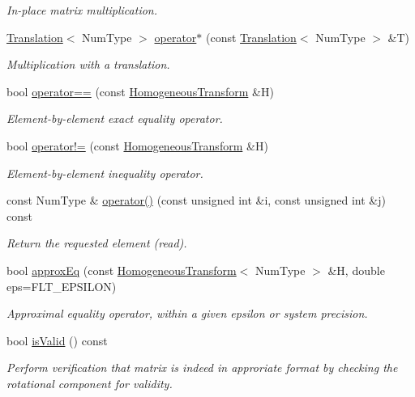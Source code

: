 \begin{DoxyCompactItemize}
\begin{DoxyCompactList}\small\item\em In-\/place matrix multiplication. \end{DoxyCompactList}\item 
\hyperlink{singletonscrews_1_1_translation}{Translation}$<$ Num\+Type $>$ \hyperlink{classscrews_1_1_homogeneous_transform_ac8c3eba60254fe6c3783af4291de779b}{operator$\ast$} (const \hyperlink{singletonscrews_1_1_translation}{Translation}$<$ Num\+Type $>$ \&T)
\begin{DoxyCompactList}\small\item\em Multiplication with a translation. \end{DoxyCompactList}\item 
bool \hyperlink{classscrews_1_1_homogeneous_transform_ab39f7433963975cd067a665a2d4a87cc}{operator==} (const \hyperlink{classscrews_1_1_homogeneous_transform}{Homogeneous\+Transform} \&H)
\begin{DoxyCompactList}\small\item\em Element-\/by-\/element exact equality operator. \end{DoxyCompactList}\item 
bool \hyperlink{classscrews_1_1_homogeneous_transform_aacfa2c940430fa310cadba384059b139}{operator!=} (const \hyperlink{classscrews_1_1_homogeneous_transform}{Homogeneous\+Transform} \&H)
\begin{DoxyCompactList}\small\item\em Element-\/by-\/element inequality operator. \end{DoxyCompactList}\item 
const Num\+Type \& \hyperlink{classscrews_1_1_homogeneous_transform_aa25cb511faf386f229c5a13f15dc9d08}{operator()} (const unsigned int \&i, const unsigned int \&j) const 
\begin{DoxyCompactList}\small\item\em Return the requested element (read). \end{DoxyCompactList}\item 
bool \hyperlink{classscrews_1_1_homogeneous_transform_a5f9baaf6e910cbc16060645842567a7a}{approx\+Eq} (const \hyperlink{classscrews_1_1_homogeneous_transform}{Homogeneous\+Transform}$<$ Num\+Type $>$ \&H, double eps=F\+L\+T\+\_\+\+E\+P\+S\+I\+L\+O\+N)
\begin{DoxyCompactList}\small\item\em Approximal equality operator, within a given epsilon or system precision. \end{DoxyCompactList}\item 
\hypertarget{classscrews_1_1_homogeneous_transform_a96c48c8656f31351fbaa3f45f43a99e0}{bool \hyperlink{classscrews_1_1_homogeneous_transform_a96c48c8656f31351fbaa3f45f43a99e0}{is\+Valid} () const }\label{classscrews_1_1_homogeneous_transform_a96c48c8656f31351fbaa3f45f43a99e0}

\begin{DoxyCompactList}\small\item\em Perform verification that matrix is indeed in approriate format by checking the rotational component for validity. \end{DoxyCompactList}\end{DoxyCompactItemize}
